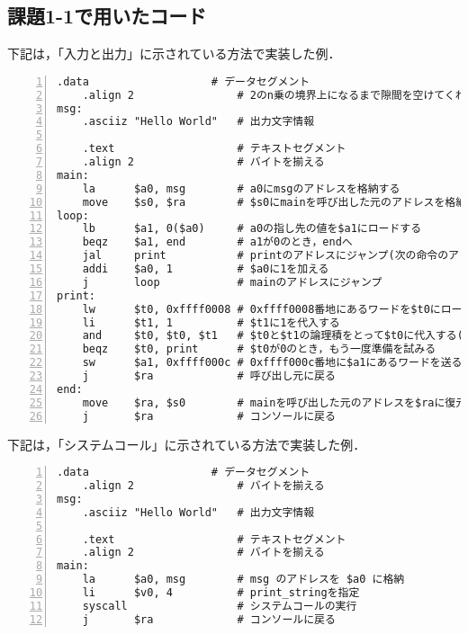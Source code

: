\subsection{課題1-1で用いたコード} \label{sec:p1-1}
下記は，「入力と出力」に示されている方法で実装した例．
\begin{Verbatim}[numbers=left, xleftmargin=10mm, numbersep=6pt,
                    fontsize=\small, baselinestretch=0.8]
    .data                   # データセグメント
    .align 2                # 2のn乗の境界上になるまで隙間を空けてくれる
msg:
    .asciiz "Hello World"   # 出力文字情報

    .text                   # テキストセグメント
    .align 2                # バイトを揃える
main:
    la      $a0, msg        # a0にmsgのアドレスを格納する
    move    $s0, $ra        # $s0にmainを呼び出した元のアドレスを格納
loop:
    lb      $a1, 0($a0)     # a0の指し先の値を$a1にロードする
    beqz    $a1, end        # a1が0のとき，endへ
    jal     print           # printのアドレスにジャンプ(次の命令のアドレスを$raに)
    addi    $a0, 1          # $a0に1を加える
    j       loop            # mainのアドレスにジャンプ
print:
    lw      $t0, 0xffff0008 # 0xffff0008番地にあるワードを$t0にロードする
    li      $t1, 1          # $t1に1を代入する
    and     $t0, $t0, $t1   # $t0と$t1の論理積をとって$t0に代入する($t0が1か確認する)
    beqz    $t0, print      # $t0が0のとき，もう一度準備を試みる
    sw      $a1, 0xffff000c # 0xffff000c番地に$a1にあるワードを送る
    j       $ra             # 呼び出し元に戻る
end:
    move    $ra, $s0        # mainを呼び出した元のアドレスを$raに復元
    j       $ra             # コンソールに戻る
\end{Verbatim}

下記は，「システムコール」に示されている方法で実装した例．
\begin{Verbatim}[numbers=left, xleftmargin=10mm, numbersep=6pt,
                    fontsize=\small, baselinestretch=0.8]
    .data                   # データセグメント
    .align 2                # バイトを揃える
msg:
    .asciiz "Hello World"   # 出力文字情報

    .text                   # テキストセグメント
    .align 2                # バイトを揃える
main:
    la      $a0, msg        # msg のアドレスを $a0 に格納
    li      $v0, 4          # print_stringを指定
    syscall                 # システムコールの実行
    j       $ra             # コンソールに戻る
\end{Verbatim}


